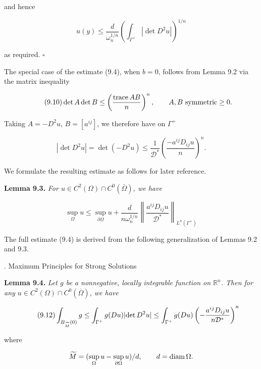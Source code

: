and hence

\[
u(y) \le \frac{d}{\omega_n^{1/n}} \left(\int_{\Gamma^+} |\det D^2u|\right)^{1/n}
\]

as required. $\square$

The special case of the estimate (9.4), when $b = 0$, follows from Lemma 9.2 via
the matrix inequality

\begin{equation}\tag{9.10}
\det A \det B \le \left(\frac{\trace AB}{n}\right)^n,\qquad A,B\ \text{symmetric} \ge 0.
\end{equation}

Taking $A = -D^2u$, $B = [a^{ij}]$, we therefore have on $\Gamma^+$

\[
|\det D^2u| = \det(-D^2u)
\le \frac{1}{\mathscr{D}^*}\left(\frac{-a^{ij}D_{ij}u}{n}\right)^n.
\]

We formulate the resulting estimate as follows for later reference.

\medskip

\textbf{Lemma 9.3.}
\textit{For $u \in C^2(\Omega) \cap C^0(\bar{\Omega})$, we have}

\begin{equation}\tag{9.11}
\sup_{\Omega} u \le \sup_{\partial\Omega} u + \frac{d}{n\omega_n^{1/n}}
\left\|\frac{a^{ij}D_{ij}u}{\mathscr{D}^*}\right\|_{L^n(\Gamma^+)}
\end{equation}

The full estimate (9.4) is derived from the following generalization of Lemmas
9.2 and 9.3.






. Maximum Principles for Strong Solutions

\bigskip

\textbf{Lemma 9.4.}
\textit{Let $g$ be a nonnegative, locally integrable function on $\mathbb{R}^n$. Then for any $u \in C^2(\Omega) \cap C^0(\overline{\Omega})$, we have}

\begin{equation}\tag{9.12}
\int_{B_{\widetilde M}(0)} g \leq \int_{\Gamma^+} g(Du)\lvert \det D^2u\rvert
\leq \int_{\Gamma^+} g(Du)\left(-\frac{a^{ij}D_{ij}u}{n\mathcal{D}^*}\right)^n
\end{equation}

\noindent where

\[
\widetilde M = (\sup_{\Omega} u - \sup_{\partial\Omega} u)/d, \qquad d = \operatorname{diam} \Omega.
\]

